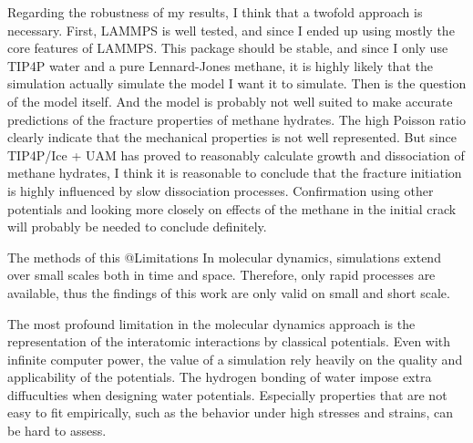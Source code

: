 Regarding the robustness of my results, I think that a twofold approach is necessary. First, LAMMPS is well tested, and since I ended up using mostly the core features of LAMMPS. This package should be stable, and since I only use TIP4P water and a pure Lennard-Jones methane, it is highly likely that the simulation actually simulate the model I want it to simulate. Then is the question of the model itself. And the model is probably not well suited to make accurate predictions of the fracture properties of methane hydrates. The high Poisson ratio clearly indicate that the mechanical properties is not well represented. But since TIP4P/Ice + UAM has proved to reasonably calculate growth and dissociation of methane hydrates, I think it is reasonable to conclude that the fracture initiation is highly influenced by slow dissociation processes. Confirmation using other potentials and looking more closely on effects of the methane in the initial crack will probably be needed to conclude definitely.

The methods of this
@Limitations
In molecular dynamics, simulations extend over small scales both in time and space. Therefore, only rapid processes are available, thus the findings of this work are only valid on small and short scale.

The most profound limitation in the molecular dynamics approach is the representation of the interatomic interactions by classical potentials. Even with infinite computer power, the value of a simulation rely heavily on the quality and applicability of the potentials. The hydrogen bonding of water impose extra diffuculties when designing water potentials. Especially properties that are not easy to fit empirically, such as the behavior under high stresses and strains, can be hard to assess.

